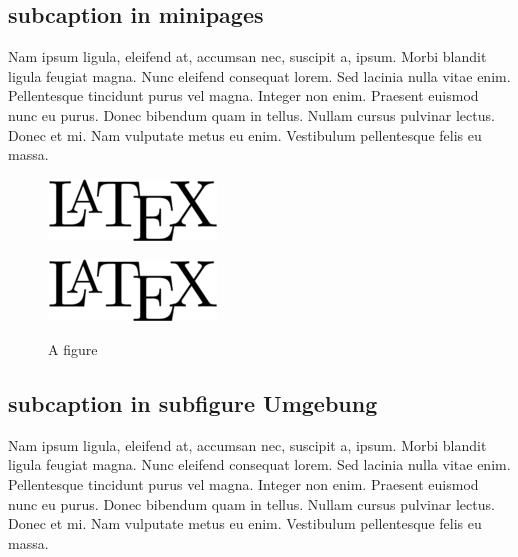 %

%
\subsection{subcaption in minipages}
	Nam ipsum ligula, eleifend at, accumsan nec, suscipit a,
	ipsum. Morbi blandit ligula feugiat magna. Nunc eleifend consequat
	lorem. Sed lacinia nulla vitae enim. Pellentesque tincidunt purus
	vel magna. Integer non enim. Praesent euismod nunc eu purus. Donec
	bibendum quam in tellus. Nullam cursus pulvinar lectus. Donec et mi.
	Nam vulputate metus eu enim. Vestibulum pellentesque felis eu
	massa.
	
	\begin{figure}[H]
	\begin{minipage}[b]{.5\linewidth}
		\centering
		\includegraphics[width=0.8\linewidth]{images/latex}
		\label{fig:1a}
	\end{minipage}%
	\begin{minipage}[b]{.5\linewidth}
		\centering
		\includegraphics[width=0.8\linewidth]{images/latex}
		\label{fig:1b}
	\end{minipage}
	\caption{A figure}\label{fig:1}
	\end{figure}

\subsection{subcaption in subfigure Umgebung}
	Nam ipsum ligula, eleifend at, accumsan nec, suscipit a,
	ipsum. Morbi blandit ligula feugiat magna. Nunc eleifend consequat
	lorem. Sed lacinia nulla vitae enim. Pellentesque tincidunt purus
	vel magna. Integer non enim. Praesent euismod nunc eu purus. Donec
	bibendum quam in tellus. Nullam cursus pulvinar lectus. Donec et mi.
	Nam vulputate metus eu enim. Vestibulum pellentesque felis eu
	massa.
	
